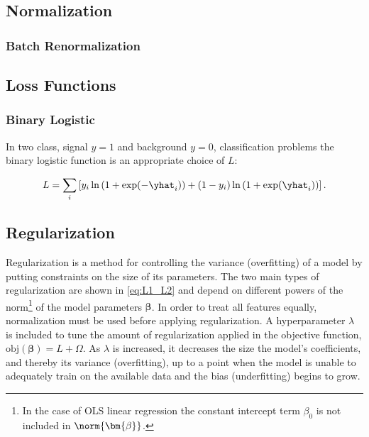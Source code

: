 \subsection{Normalization}
\label{ml:general:normalization}

\subsubsection{Batch Renormalization}
\label{ml:general:reg:batch_renorm}

\subsection{Loss Functions}
\label{ml:general:loss_Func}


\subsubsection{Binary Logistic}
\label{ml:supervised:loss_functions:binary_logistic}

In two class, signal $y=1$ and background $y=0$, classification problems the binary logistic function is an appropriate choice of $L$:

\begin{equation} \label{eq:binary_logistic}
L = \sum_{i} \left[y_{i} \ln\left(1 + \exp(-\yhat_{i})\right) +\left(1-y_{i}\right) \ln\left(1 + \exp(\yhat_{i})\right)\right].
\end{equation}


\subsection{Regularization}
\label{ml:general:reg}

Regularization is a method for controlling the variance (overfitting)
of a model by putting constraints on the size of its parameters.
The two main types of regularization are shown in \cref{eq:L1_L2}
and depend on different powers of the norm\footnote{In
the case of OLS linear regression the constant intercept term $\beta_{0}$ is not included in $\norm{\bm{\beta}}$.} of the model parameters $\bm{\beta}$.
In order to treat all features equally, normalization must be used before applying regularization.
A hyperparameter $\lambda$ is included to tune the amount of regularization applied in the objective function,
$\text{obj}\left(\bm{\beta}\right) = L + \Omega$.
As $\lambda$ is increased, it decreases the size the model's coefficients, and thereby its variance (overfitting),
up to a point when the model is unable to adequately train on the available data and the bias (underfitting) begins to grow.

